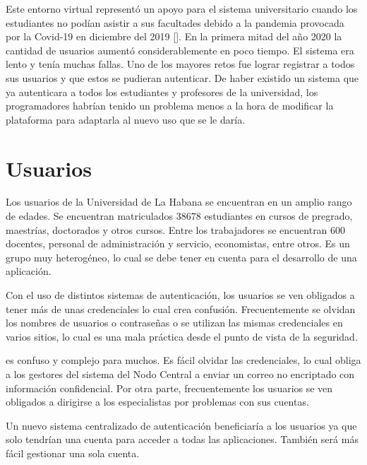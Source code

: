 Este entorno virtual representó un apoyo para el sistema universitario cuando los estudiantes no podían asistir a sus facultades debido a la pandemia provocada por la Covid-19 en diciembre del 2019 [\cite{ferrer2020pandemia}]. En la primera mitad del año 2020 la cantidad de usuarios aumentó considerablemente en poco tiempo. El sistema era lento y tenía muchas fallas. Uno de los mayores retos fue lograr registrar a todos sus usuarios y que estos se pudieran autenticar. De haber existido un sistema que ya autenticara a todos los estudiantes y profesores de la universidad, los programadores habrían tenido un problema menos a la hora de modificar la plataforma para adaptarla al nuevo uso que se le daría.

\section{Usuarios} \label{user-layer}

Los usuarios de la Universidad de La Habana se encuentran en un amplio rango de edades. Se encuentran matriculados $38 678$ estudiantes en cursos de pregrado, maestrías, doctorados y otros cursos. Entre los trabajadores se encuentran $600$ docentes, personal de administración y servicio, economistas, entre otros. Es un grupo muy heterogéneo, lo cual se debe tener en cuenta para el desarrollo de una aplicación.

Con el uso de distintos sistemas de autenticación, los usuarios se ven obligados a tener más de unas credenciales lo cual crea confusión. Frecuentemente se olvidan los nombres de usuarios o contraseñas o se utilizan las mismas credenciales en varios sitios, lo cual es una mala práctica desde el punto de vista de la seguridad.


es confuso y complejo para muchos. Es fácil olvidar las credenciales, lo cual obliga a los gestores del sistema del Nodo Central a enviar un correo no encriptado con información confidencial. Por otra parte, frecuentemente los usuarios se ven obligados a dirigirse a los especialistas por problemas con sus cuentas. 

Un nuevo sistema centralizado de autenticación beneficiaría a los usuarios ya que solo tendrían una cuenta para acceder a todas las aplicaciones. También será más fácil gestionar una sola cuenta.